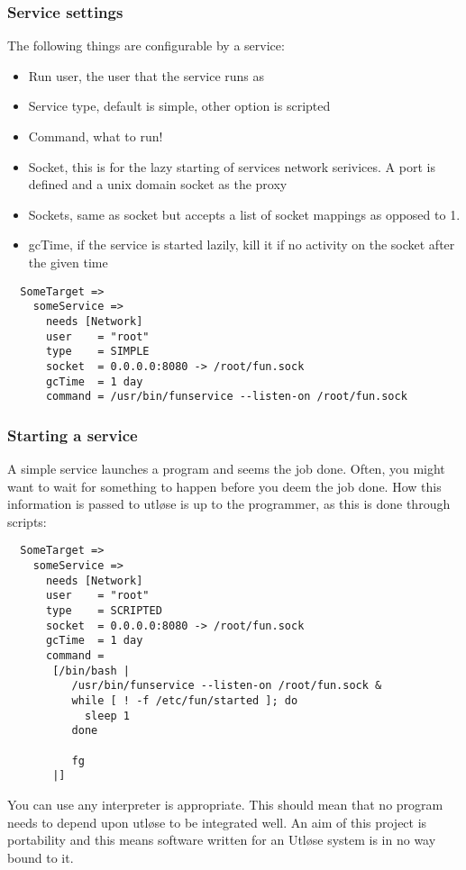 \documentclass{article}
\begin{document}
\subsubsection{Service settings}
The following things are configurable by a service:
\begin{itemize}
  \item Run user, the user that the service runs as
  \item Service type, default is simple, other option is scripted
  \item Command, what to run!
  \item{
      Socket, this is for the lazy starting of services network serivices. A port is defined and a
      unix domain socket as the proxy}
  \item Sockets, same as socket but accepts a list of socket mappings as opposed to 1.
  \item gcTime, if the service is started lazily, kill it if no activity on the socket after the given time
\end{itemize}

\begin{verbatim}
  SomeTarget =>
    someService =>
      needs [Network]
      user    = "root"
      type    = SIMPLE
      socket  = 0.0.0.0:8080 -> /root/fun.sock
      gcTime  = 1 day
      command = /usr/bin/funservice --listen-on /root/fun.sock
\end{verbatim}

\subsubsection{Starting a service}
A simple service launches a program and seems the job done. Often, you might want to
wait for something to happen before you deem the job done. How this information is passed to
utløse is up to the programmer, as this is done through scripts:

\begin{verbatim}
  SomeTarget =>
    someService =>
      needs [Network]
      user    = "root"
      type    = SCRIPTED
      socket  = 0.0.0.0:8080 -> /root/fun.sock
      gcTime  = 1 day
      command = 
       [/bin/bash |
          /usr/bin/funservice --listen-on /root/fun.sock &
          while [ ! -f /etc/fun/started ]; do
            sleep 1
          done

          fg
       |]
\end{verbatim}

You can use any interpreter is appropriate. This should mean that no program needs to depend
upon utløse to be integrated well. An aim of this project is portability and this means
software written for an Utløse system is in no way bound to it.
\end{document}
